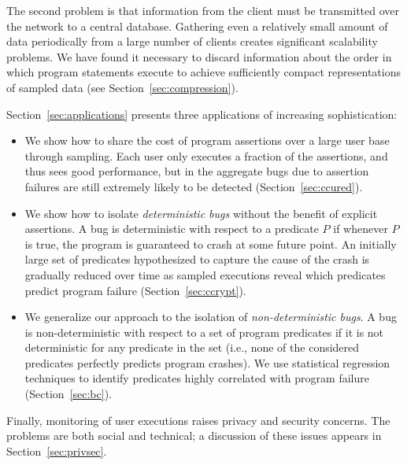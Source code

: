 The second problem is that information from the client must be
transmitted over the network to a central database.  Gathering even a
relatively small amount of data periodically from a large number of
clients creates significant scalability problems.  We have found it
necessary to discard information about the order in which program
statements execute to achieve sufficiently compact representations of
sampled data (see Section~\ref{sec:compression}).

Section~\ref{sec:applications} presents three applications
of increasing sophistication:
\begin{itemize}
\item   We show how to
share the cost of program assertions over a large user base through
sampling.  Each user only executes a fraction of the assertions, and
thus sees good performance, but in the aggregate bugs due to assertion
failures are still extremely likely to be detected (Section~\ref{sec:ccured}). 

\item We show how to isolate {\em deterministic bugs} without the
benefit of explicit assertions.  A bug is deterministic with respect
to a predicate $P$ if whenever $P$ is true, the program is guaranteed
to crash at some future point.  An initially large set of predicates
hypothesized to capture the cause of the crash is gradually reduced
over time as sampled executions reveal which predicates predict
program failure (Section~\ref{sec:ccrypt}).


\item We generalize our approach to the isolation of
{\em non-deterministic bugs}.  A bug is non-deterministic with respect
to a set of program predicates if it is not deterministic for any
predicate in the set (i.e., none of the considered predicates
perfectly predicts program crashes).  We use statistical regression
techniques to identify predicates highly correlated with program
failure (Section~\ref{sec:bc}).

\end{itemize}

Finally, monitoring of user executions raises privacy
and security concerns.  The problems are both social and technical; a
discussion of these issues appears in Section~\ref{sec:privsec}.

